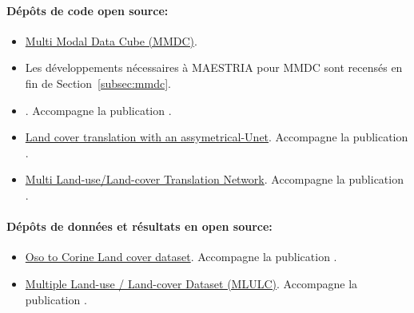 \paragraph{Dépôts de code open source:}
\begin{itemize}
    \item \href{https://src.koda.cnrs.fr/mmdc}{Multi Modal Data Cube (MMDC)}.
    \item Les développements nécessaires à MAESTRIA pour MMDC sont recensés en fin de Section~\ref{subsec:mmdc}.
    \item {}. Accompagne la publication \cite{GIRYFOUQUET2021320}.
    \item \href{https://github.com/LBaudoux/Unet_LandCoverTranslator}{Land cover translation with an assymetrical-Unet}. Accompagne la publication \cite{Luc_RS}.
    \item \href{https://github.com/LBaudoux/MLULC}{Multi Land-use/Land-cover Translation Network}. Accompagne la publication \cite{luc_ijgis}.
\end{itemize}

\paragraph{Dépôts de données et résultats en open source:}
\begin{itemize}
    \item \href{https://zenodo.org/records/4459484}{Oso to Corine Land cover dataset}. Accompagne la publication \cite{Luc_RS}.
    \item \href{https://zenodo.org/records/5843595}{Multiple Land-use / Land-cover Dataset (MLULC)}. Accompagne la publication \cite{luc_ijgis}.
\end{itemize}

